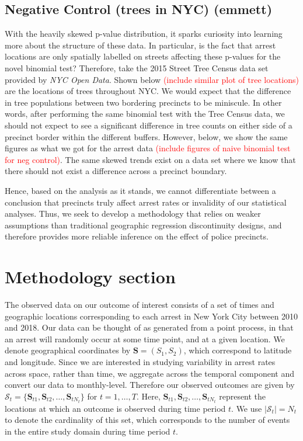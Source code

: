 \documentclass[a4paper,11pt]{article}
\begin{document}
\subsection{Negative Control (trees in NYC) (emmett)}
With the heavily skewed p-value distribution, it sparks curiosity into learning more about the structure of these data. In particular, is the fact that arrest locations are only spatially labelled on streets affecting these p-values for the novel binomial test? Therefore, take the 2015 Street Tree Census data set provided by \textit{NYC Open Data}. Shown below \textcolor{red}{(include similar plot of tree locations)} are the locations of trees throughout NYC. We would expect that the difference in tree populations between two bordering precincts to be miniscule. In other words, after performing the same binomial test with the Tree Census data, we should not expect to see a significant difference in tree counts on either side of a precinct border within the different buffers. However, below, we show the same figures as what we got for the arrest data \textcolor{red}{(include figures of naive binomial test for neg control)}. The same skewed trends exist on a data set where we know that there should not exist a difference across a precinct boundary. 

Hence, based on the analysis as it stands, we cannot differentiate between a conclusion that precincts truly affect arrest rates or invalidity of our statistical analyses. Thus, we seek to develop a methodology that relies on weaker assumptions than traditional geographic regression discontinuity designs, and therefore provides more reliable inference on the effect of police precincts. 

\section{Methodology section}

The observed data on our outcome of interest consists of a set of times and geographic locations corresponding to each arrest in New York City between 2010 and 2018. Our data can be thought of as generated from a point process, in that an arrest will randomly occur at some time point, and at a given location. We denote geographical coordinates by $\boldsymbol{S} = (S_{1}, S_{2})$, which correspond to latitude and longitude. Since we are interested in studying variability in arrest rates across space, rather than time, we aggregate across the temporal component and convert our data to monthly-level. Therefore our observed outcomes are given by $\mathcal{S}_t = \{\boldsymbol{S}_{t1}, \boldsymbol{S}_{t2}, \dots, \boldsymbol{S}_{t N_t}\}$ for $t=1, \dots, T$. Here, $\boldsymbol{S}_{t1}, \boldsymbol{S}_{t2}, \dots, \boldsymbol{S}_{t N_t}$ represent the locations at which an outcome is observed during time period $t$. We use $|\mathcal{S}_t| = N_t$ to denote the cardinality of this set, which corresponds to the number of events in the entire study domain during time period $t$. 
\end{document}
